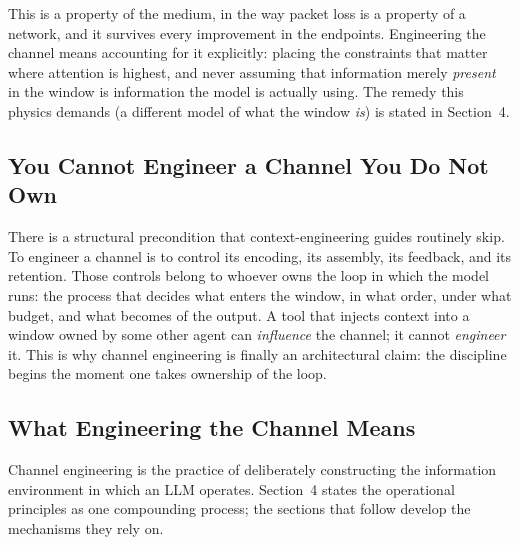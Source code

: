 \documentclass[11pt, a4paper]{article}
\begin{document}
This is a property of the medium, in the way packet loss is a property of a network, and
it survives every improvement in the endpoints. Engineering the channel means accounting
for it explicitly:
placing the constraints that matter where attention is highest, and never assuming that
information merely \emph{present} in the window is information the model is actually
using. The remedy this physics demands (a different model of what the window
\emph{is}) is stated in Section~4.

\subsection{You Cannot Engineer a Channel You Do Not Own}

There is a structural precondition that context-engineering guides routinely skip. To engineer
a channel is to control its encoding, its assembly, its feedback, and its retention. Those
controls belong to whoever owns the loop in which the model runs: the process that
decides what enters the window, in what order, under what budget, and what becomes of the
output. A tool that injects context into a window owned by some other agent can
\emph{influence} the channel; it cannot \emph{engineer} it. This is why channel
engineering is finally an architectural claim: the discipline begins the moment one takes
ownership of the loop.

\subsection{What Engineering the Channel Means}

Channel engineering is the practice of deliberately constructing the information
environment in which an LLM operates. Section~4 states the operational principles as one
compounding process; the sections that follow develop the mechanisms they rely on.
\end{document}
